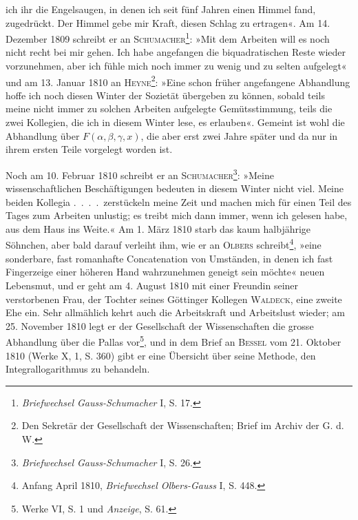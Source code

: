 ich ihr die Engelsaugen, in denen ich seit fünf Jahren einen Himmel fand,
zugedrückt. Der Himmel gebe mir Kraft, diesen Schlag zu ertragen«. Am
14. Dezember 1809 schreibt er an \textsc{Schumacher}\footnote{\textit{Briefwechsel Gauss-Schumacher} I, S. 17.}: »Mit dem Arbeiten will es
noch nicht recht bei mir gehen. Ich habe angefangen die biquadratischen
Reste wieder vorzunehmen, aber ich fühle mich noch immer zu wenig und
zu selten aufgelegt« und am 13. Januar 1810 an \textsc{Heyne}\footnote{Den Sekretär der Gesellschaft der Wissenschaften; Brief im Archiv der G. d. W.}: »Eine schon früher
angefangene Abhandlung hoffe ich noch diesen Winter der Sozietät übergeben
zu können, sobald teils meine nicht immer zu solchen Arbeiten aufgelegte
Gemütsstimmung, teils die zwei Kollegien, die ich in diesem Winter lese, es
erlauben«. Gemeint ist wohl die Abhandlung über \(F(\alpha,\beta,\gamma,x)\), die aber erst
zwei Jahre später und da nur in ihrem ersten Teile vorgelegt worden ist.\par
\clearpage{}
\noindent Noch am 10. Februar 1810 schreibt er an \textsc{Schumacher}\footnote{\textit{Briefwechsel Gauss-Schumacher} I, S. 26.}: »Meine wissenschaftlichen
Beschäftigungen bedeuten in diesem Winter nicht viel. Meine
beiden Kollegia \mbox{.\ .\ .\ .}\ zerstückeln meine Zeit und machen mich für einen Teil
des Tages zum Arbeiten unlustig; es treibt mich dann immer, wenn ich gelesen
habe, aus dem Haus ins Weite.« Am 1. März 1810 starb das kaum
halbjährige Söhnchen, aber bald darauf verleiht ihm, wie er an \textsc{Olbers}
schreibt\footnote{Anfang April 1810, \textit{Briefwechsel Olbers-Gauss} I, S. 448.}, »eine sonderbare, fast romanhafte Concatenation von Umständen,
in denen ich fast Fingerzeige einer höheren Hand wahrzunehmen geneigt sein
möchte« neuen Lebensmut, und er geht am 4. August 1810 mit einer Freundin
seiner verstorbenen Frau, der Tochter seines Göttinger Kollegen \textsc{Waldeck},
eine zweite Ehe ein. Sehr allmählich kehrt auch die Arbeitskraft und Arbeitslust
wieder; am 25. November 1810 legt er der Gesellschaft der Wissenschaften
die grosse Abhandlung über die Pallas vor\footnote{Werke VI, S. 1 und \textit{Anzeige}, S. 61.}, und in dem Brief an
\textsc{Bessel} vom 21. Oktober 1810 (Werke X, 1, S. 360) gibt er eine Übersicht
über seine Methode, den Integrallogarithmus zu behandeln.
